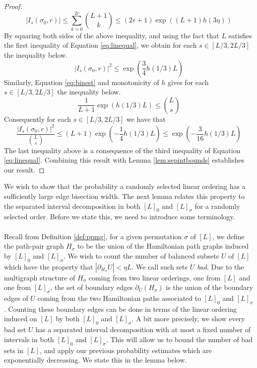 \documentclass[11pt,a4paper]{amsart}
\theoremstyle{definition}
\theoremstyle{remark}
\begin{document}
\begin{proof}
\begin{equation*}
|I_{s}(\sigma_{0},r)| \leq \sum_{k=0}^{2r} \binom{L+1}{k} \leq (2r+1)\exp\left((L+1)h(3\eta)\right)
\end{equation*}
By squaring both sides of the above inequality, and using the fact that $L$ satisfies the first inequality of Equation \ref{eq:linequal}, we obtain for each $s \in [L/3,2L/3]$ the inequality below.
\begin{equation}\label{eq:numbound}
|I_{s}(\sigma_{0},r)|^{2} \leq \exp\left(\frac{3}{4}h(1/3)L\right)
\end{equation}
Similarly, Equation \ref{eq:binest} and monotonicity of $h$ gives for each $s \in [L/3,2L/3]$ the inequality below.
\begin{equation}\label{eq:denbound}
\frac{1}{L+1}\exp\left(h(1/3)L\right) \leq \binom{L}{s}  
\end{equation}
Consequently for each $s \in [L/3,2L/3]$ we have that
\begin{equation*}
 \frac{|I_{s}(\sigma_{0},r)|^{2}}{\binom{L}{s}} \leq \left(L+1\right)\exp\left(-\frac{1}{4}h(1/3)L\right) \leq \exp\left(-\frac{3}{16}h(1/3)L\right)
\end{equation*}
The last inequality above is a consequence of the third inequality of Equation \ref{eq:linequal}.  Combining this result with Lemma \ref{lem:sepintbounds} establishes our result.
\end{proof}

We wish to show that the probability a randomly selected linear ordering has a sufficiently large edge bisection width.  The next lemma relates this property to the separated interval decomposition in both $[L]_{0}$ and $[L]_{\sigma}$ for a randomly selected order.  Before we state this, we need to introduce some terminology.  \\
\\
Recall from Definition \ref{def:ppmg}, for a given permutation $\sigma$ of $[L]$, we define the path-pair graph $H_{\sigma}$ to be the union of the Hamiltonian path graphs induced by $[L]_{0}$ and $[L]_{\sigma}$.  We wish to count the number of balanced subsets $U$ of $[L]$ which have the property that $|\partial_{H_{\sigma}} U| < \eta L$.  We call such sets $U$ \emph{bad}.  Due to the multigraph structure of $H_{\sigma}$ coming from two linear orderings, one from $[L]$ and one from $[L]_{\sigma}$, the set of boundary edges $\partial_{U}(H_{\sigma})$ is the union of the boundary edges of $U$ coming from the two Hamiltonian paths associated to $[L]_{0}$ and $[L]_{\sigma}$.  Counting these boundary edges can be done in terms of the linear ordering induced on $[L]$ by both $[L]_{0}$ and $[L]_{\sigma}$.  A bit more precisely, we show every bad set $U$ has a separated interval decomposition with at most a fixed number of intervals in both $[L]_{0}$ and $[L]_{\sigma}$.  This will allow us to bound the number of bad sets in $[L]$, and apply our previous probability estimates which are exponentially decreasing.  We state this in the lemma below.
\end{document}
